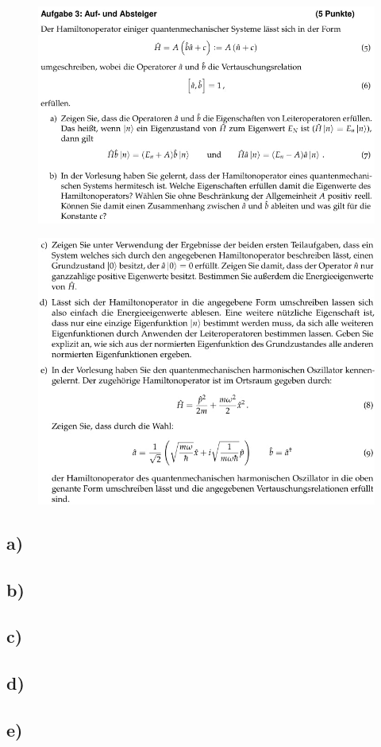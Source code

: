     \begin{figure}
        \centering
        \includegraphics[width=\textwidth]{images/Aufgabe3ab.jpg}
        \label{fig:4}
    \end{figure}
    \begin{figure}
        \centering
        \includegraphics[width=\textwidth]{images/Aufgabe3cde.jpg}
        \label{fig:5}
    \end{figure}

    \subsection{a)}

    \subsection{b)}

    \subsection{c)}

    \subsection{d)}

    \subsection{e)}

